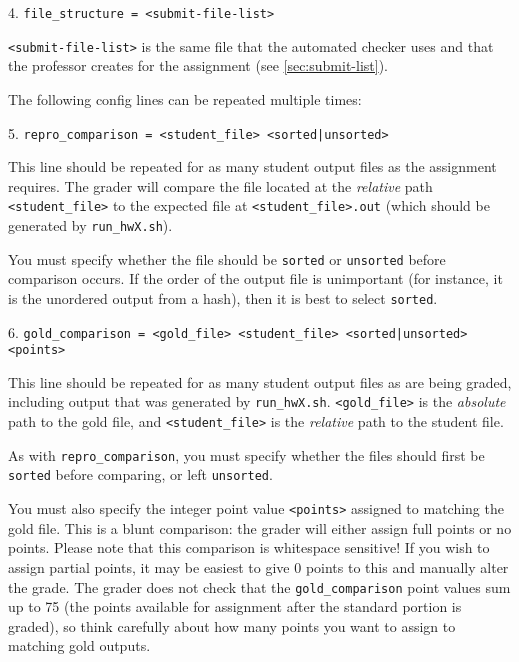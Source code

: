 \documentclass[12pt]{article}
\begin{document}
\vspace{5pt}

4. \texttt{file\_structure = <submit-file-list>}

\texttt{<submit-file-list>} is the same file that the automated checker uses and that the professor creates for the assignment (see \ref{sec:submit-list}).

\vspace{5pt}

\noindent The following config lines can be repeated multiple times:

5. \texttt{repro\_comparison = <student\_file> <sorted|unsorted>}

This line should be repeated for as many student output files as the assignment requires. The grader will compare the file located at the \textit{relative} path \texttt{<student\_file>} to the expected file at \texttt{<student\_file>.out} (which should be generated by \texttt{run\_hwX.sh}).

You must specify whether the file should be \texttt{sorted} or \texttt{unsorted} before comparison occurs. If the order of the output file is unimportant (for instance, it is the unordered output from a hash), then it is best to select \texttt{sorted}.

\vspace{5pt}

6. \texttt{gold\_comparison = <gold\_file> <student\_file> <sorted|unsorted> <points>}

This line should be repeated for as many student output files as are being graded, including output that was generated by \texttt{run\_hwX.sh}. \texttt{<gold\_file>} is the \textit{absolute} path to the gold file, and \texttt{<student\_file>} is the \textit{relative} path to the student file.	

As with \texttt{repro\_comparison}, you must specify whether the files should first be \texttt{sorted} before comparing, or left \texttt{unsorted}.

You must also specify the integer point value \texttt{<points>} assigned to matching the gold file. This is a blunt comparison: the grader will either assign full points or no points. Please note that this comparison is whitespace sensitive! If you wish to assign partial points, it may be easiest to give 0 points to this and manually alter the grade. The grader does not check that the \texttt{gold\_comparison} point values sum up to 75 (the points available for assignment after the standard portion is graded), so think carefully about how many points you want to assign to matching gold outputs.
\end{document}
